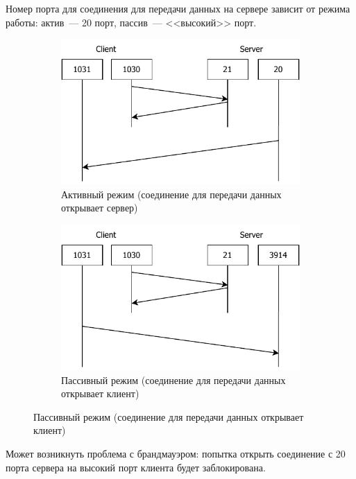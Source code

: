 Номер порта для соединения для передачи данных на сервере зависит от режима работы: актив~--- 20 порт, пассив~--- <<высокий>> порт.

\begin{figure}[H]
    \centering
    \begin{subfigure}{0.45\textwidth}
        \includegraphics[width=\textwidth]{12/notes/inc/ftp-active}
        \caption{Активный режим (соединение для передачи данных открывает сервер)}
    \end{subfigure}
    \hspace{.5cm}
    \begin{subfigure}{0.45\textwidth}
        \includegraphics[width=\textwidth]{12/notes/inc/ftp-passive}
        \caption{Пассивный режим (соединение для передачи данных открывает клиент)}
    \end{subfigure}
\end{figure}

Может возникнуть проблема с брандмауэром: попытка открыть соединение с 20 порта сервера на высокий порт клиента будет заблокирована.

